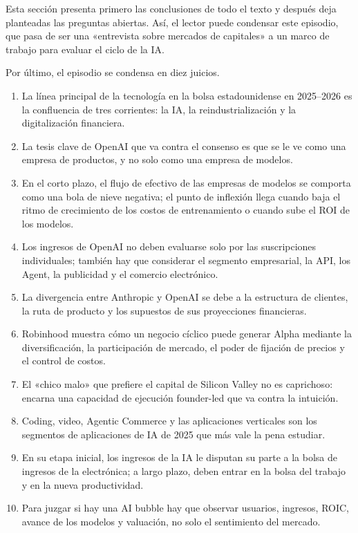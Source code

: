 \documentclass[a4paper]{article}
\begin{document}
Esta sección presenta primero las conclusiones de todo el texto y después deja planteadas las preguntas abiertas. Así, el lector puede condensar este episodio, que pasa de ser una «entrevista sobre mercados de capitales» a un marco de trabajo para evaluar el ciclo de la IA.

Por último, el episodio se condensa en diez juicios.

\begin{enumerate}
\item La línea principal de la tecnología en la bolsa estadounidense en 2025--2026 es la confluencia de tres corrientes: la IA, la reindustrialización y la digitalización financiera.
\item La tesis clave de OpenAI que va contra el consenso es que se le ve como una empresa de productos, y no solo como una empresa de modelos.
\item En el corto plazo, el flujo de efectivo de las empresas de modelos se comporta como una bola de nieve negativa; el punto de inflexión llega cuando baja el ritmo de crecimiento de los costos de entrenamiento o cuando sube el ROI de los modelos.
\item Los ingresos de OpenAI no deben evaluarse solo por las suscripciones individuales; también hay que considerar el segmento empresarial, la API, los Agent, la publicidad y el comercio electrónico.
\item La divergencia entre Anthropic y OpenAI se debe a la estructura de clientes, la ruta de producto y los supuestos de sus proyecciones financieras.
\item Robinhood muestra cómo un negocio cíclico puede generar Alpha mediante la diversificación, la participación de mercado, el poder de fijación de precios y el control de costos.
\item El «chico malo» que prefiere el capital de Silicon Valley no es caprichoso: encarna una capacidad de ejecución founder-led que va contra la intuición.
\item Coding, video, Agentic Commerce y las aplicaciones verticales son los segmentos de aplicaciones de IA de 2025 que más vale la pena estudiar.
\item En su etapa inicial, los ingresos de la IA le disputan su parte a la bolsa de ingresos de la electrónica; a largo plazo, deben entrar en la bolsa del trabajo y en la nueva productividad.
\item Para juzgar si hay una AI bubble hay que observar usuarios, ingresos, ROIC, avance de los modelos y valuación, no solo el sentimiento del mercado.
\end{enumerate}
\end{document}
